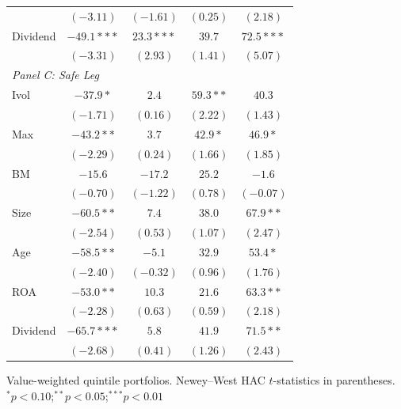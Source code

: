 \begin{tabular}{l c c c c}
 & $(-3.11)$ & $(-1.61)$ & $(0.25)$ & $(2.18)$ \\
Dividend & $-49.1***$ & $23.3***$ & $39.7$ & $72.5***$ \\
 & $(-3.31)$ & $(2.93)$ & $(1.41)$ & $(5.07)$ \\
\midrule
\multicolumn{5}{l}{\textit{Panel C: Safe Leg}} \\
Ivol & $-37.9*$ & $2.4$ & $59.3**$ & $40.3$ \\
 & $(-1.71)$ & $(0.16)$ & $(2.22)$ & $(1.43)$ \\
Max & $-43.2**$ & $3.7$ & $42.9*$ & $46.9*$ \\
 & $(-2.29)$ & $(0.24)$ & $(1.66)$ & $(1.85)$ \\
BM & $-15.6$ & $-17.2$ & $25.2$ & $-1.6$ \\
 & $(-0.70)$ & $(-1.22)$ & $(0.78)$ & $(-0.07)$ \\
Size & $-60.5**$ & $7.4$ & $38.0$ & $67.9**$ \\
 & $(-2.54)$ & $(0.53)$ & $(1.07)$ & $(2.47)$ \\
Age & $-58.5**$ & $-5.1$ & $32.9$ & $53.4*$ \\
 & $(-2.40)$ & $(-0.32)$ & $(0.96)$ & $(1.76)$ \\
ROA & $-53.0**$ & $10.3$ & $21.6$ & $63.3**$ \\
 & $(-2.28)$ & $(0.63)$ & $(0.59)$ & $(2.18)$ \\
Dividend & $-65.7***$ & $5.8$ & $41.9$ & $71.5**$ \\
 & $(-2.68)$ & $(0.41)$ & $(1.26)$ & $(2.43)$ \\
\bottomrule
\end{tabular}
\vspace{4pt}
\begin{minipage}{0.9\textwidth}
\footnotesize
Value-weighted quintile portfolios. Newey--West HAC $t$-statistics in parentheses.
$^{*}p<0.10$;\quad $^{**}p<0.05$;\quad $^{***}p<0.01$
\end{minipage}
